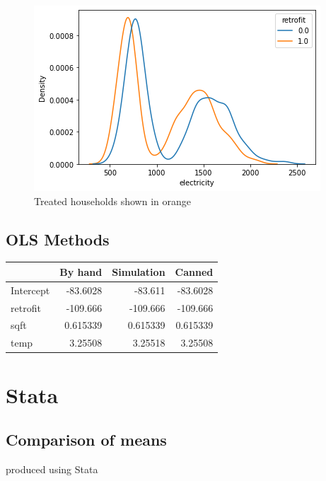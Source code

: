 \documentclass{article}
\begin{document}
\begin{figure}[ht]
    \centering
    \includegraphics[scale = 0.7]{kdeplot.png}
    \caption{Treated households shown in orange}
\end{figure}

\vspace{5cm}


\subsection{OLS Methods}

\begin{longtable}{lrrr}
\hline
           &     By hand &   Simulation &      Canned \\
\hline
\endhead
 Intercept &  -83.6028   &   -83.611    &  -83.6028   \\
 retrofit  & -109.666    &  -109.666    & -109.666    \\
 sqft      &    0.615339 &     0.615339 &    0.615339 \\
 temp      &    3.25508  &     3.25518  &    3.25508  \\
\hline
\end{longtable}


\section{Stata}

\subsection{Comparison of means}


\begin{table}[ht]
    \centering
    
    \caption{produced using Stata}
    \label{tab:statasummary}
\end{table}
\end{document}
